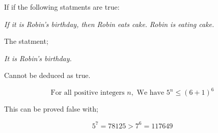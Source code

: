 \documentclass{tufte-handout}
\begin{document}
 


\begin{question}

\qpart

If if the following statments are true:

\begin{center}
\textit{If it is Robin's birthday, then Robin eats cake.}
\textit{Robin is eating cake.}
\end{center}

The statment;
\begin{center}
\textit{It is Robin's birthday.}
\end{center}

Cannot be deduced as true. 

\qpart

\[ \text{For all positive integers } n, \text{ We have } 5^{n}\leq(6+1)^{6} \]

This can be proved false with;

\[ 5^{7} = 78125 > 7^{6} = 117649 \]

\end{question}

\end{document}
